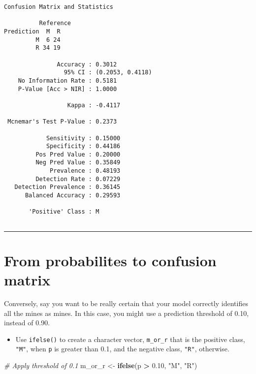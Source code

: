 \documentclass[
]{book}
\newenvironment{Shaded}{\begin{snugshade}}{\end{snugshade}}
\newcommand{\CommentTok}[1]{\textcolor[rgb]{0.56,0.35,0.01}{\textit{#1}}}
\newcommand{\FloatTok}[1]{\textcolor[rgb]{0.00,0.00,0.81}{#1}}
\newcommand{\KeywordTok}[1]{\textcolor[rgb]{0.13,0.29,0.53}{\textbf{#1}}}
\newcommand{\NormalTok}[1]{#1}
\newcommand{\OperatorTok}[1]{\textcolor[rgb]{0.81,0.36,0.00}{\textbf{#1}}}
\newcommand{\StringTok}[1]{\textcolor[rgb]{0.31,0.60,0.02}{#1}}
\providecommand{\tightlist}{%
  \setlength{\itemsep}{0pt}\setlength{\parskip}{0pt}}
\begin{document}
\begin{verbatim}
Confusion Matrix and Statistics

          Reference
Prediction  M  R
         M  6 24
         R 34 19
                                          
               Accuracy : 0.3012          
                 95% CI : (0.2053, 0.4118)
    No Information Rate : 0.5181          
    P-Value [Acc > NIR] : 1.0000          
                                          
                  Kappa : -0.4117         
                                          
 Mcnemar's Test P-Value : 0.2373          
                                          
            Sensitivity : 0.15000         
            Specificity : 0.44186         
         Pos Pred Value : 0.20000         
         Neg Pred Value : 0.35849         
             Prevalence : 0.48193         
         Detection Rate : 0.07229         
   Detection Prevalence : 0.36145         
      Balanced Accuracy : 0.29593         
                                          
       'Positive' Class : M               
                                          
\end{verbatim}

\begin{center}\rule{0.5\linewidth}{0.5pt}\end{center}

\hypertarget{from-probabilites-to-confusion-matrix}{%
\section{From probabilites to confusion matrix}\label{from-probabilites-to-confusion-matrix}}

Conversely, say you want to be really certain that your model correctly identifies all the mines as mines. In this case, you might use a prediction threshold of 0.10, instead of 0.90.

\begin{itemize}
\tightlist
\item
  Use \texttt{ifelse()} to create a character vector, \texttt{m\_or\_r} that is the positive class, \texttt{"M"}, when \texttt{p} is greater than 0.1, and the negative class, \texttt{"R"}, otherwise.
\end{itemize}

\begin{Shaded}
\begin{Highlighting}[]
\CommentTok{# Apply threshold of 0.1}
\NormalTok{m_or_r <-}\StringTok{ }\KeywordTok{ifelse}\NormalTok{(p }\OperatorTok{>}\StringTok{ }\FloatTok{0.10}\NormalTok{, }\StringTok{"M"}\NormalTok{, }\StringTok{"R"}\NormalTok{)}
\end{Highlighting}
\end{Shaded}
\end{document}
